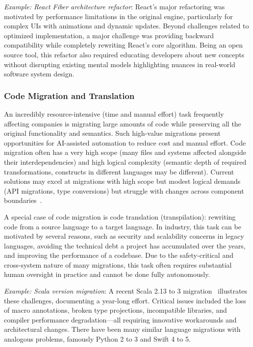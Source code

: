\begin{tcolorbox}[colback=lightblue, boxrule=0pt, arc=5pt, outer arc=5pt]
\textit{Example: React Fiber architecture refactor}: React's major refactoring was motivated by performance limitations in the original engine, particularly for complex UIs with animations and dynamic updates. Beyond challenges related to optimized implementation, a major challenge was providing backward compatibility while completely rewriting React's core algorithm. Being an open source tool, this refactor also required educating developers about new concepts without disrupting existing mental models highlighting nuances in real-world software system design. %
\end{tcolorbox}


\subsubsection{Code Migration and Translation} 

An incredibly resource-intensive (time and manual effort) task frequently affecting companies is migrating large amounts of code while preserving all the original functionality and semantics. Such high-value migrations present opportunities for AI-assisted automation to reduce cost and manual effort. Code migration often has a very high scope (many files and systems affected alongside their interdependencies) and high logical complexity (semantic depth of required transformations, constructs in different languages may be different). Current solutions may excel at migrations with high scope but modest logical demands (API migrations, type conversions) but struggle with changes across component boundaries~\citep{nikolov2025google}. 

A special case of code migration is code translation (transpilation): rewriting code from a source language to a target language. In industry, this task can be motivated by several reasons, such as security and scalability concerns in legacy languages, avoiding the technical debt a project has accumulated over the years, and improving the performance of a codebase. Due to the safety-critical and cross-system nature of many migrations, this task often requires substantial human oversight in practice and cannot be done fully autonomously. 

\begin{tcolorbox}[colback=lightblue, boxrule=0pt, arc=5pt, outer arc=5pt]
\textit{Example: Scala version migration}: A recent Scala 2.13 to 3 migration~\citep{scalamigrate} illustrates these challenges, documenting a year-long effort. Critical issues included the loss of macro annotations, broken type projections, incompatible libraries, and compiler performance degradation—all requiring innovative workarounds and architectural changes. There have been many similar language migrations with analogous problems, famously Python 2 to 3 and Swift 4 to 5. 
\end{tcolorbox}

